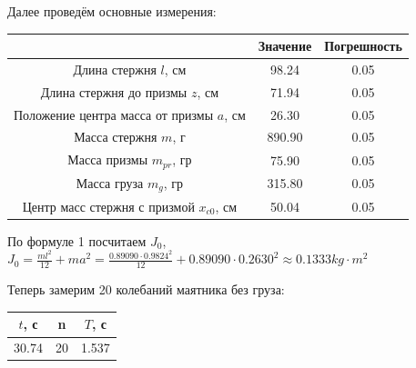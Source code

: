 \documentclass[12pt, a4paper]{article}
\begin{document}
Далее проведём основные измерения:

\begin{center}
    \begin{tabular}{|c|c|c|}
        \hline

        & Значение & Погрешность \\
        \hline

        Длина стержня $l$, см & 98.24 & 0.05 \\

        \hline

        Длина стержня до призмы $z$, см & 71.94 & 0.05 \\

        \hline

        Положение центра масса от призмы $a$, см & 26.30 & 0.05 \\

        \hline

        Масса стержня $m$, г & 890.90 & 0.05 \\

        \hline

        Масса призмы $m_{pr}$, гр & 75.90 & 0.05 \\

        \hline

        Масса груза $m_{g}$, гр & 315.80 & 0.05 \\

        \hline

        Центр масс стержня с призмой $x_{c0}$, см & 50.04 & 0.05 \\

        \hline
    \end{tabular}
\end{center}

По формуле 1 посчитаем $J_0$, $J_0 = \frac{ml^2}{12} + ma^2 = 
\frac{0.89090 \cdot 0.9824 ^ 2}{12} + 0.89090 \cdot 0.2630^2
\approx 0.1333 kg \cdot m^2$

Теперь замерим 20 колебаний маятника без груза:

\begin{center}
    \begin{tabular}{|c|c|c|}
        \hline

        $t$, с & n & $T$, с \\

        \hline

        30.74 & 20 & 1.537 \\

        \hline
    \end{tabular}
\end{center}
\end{document}
